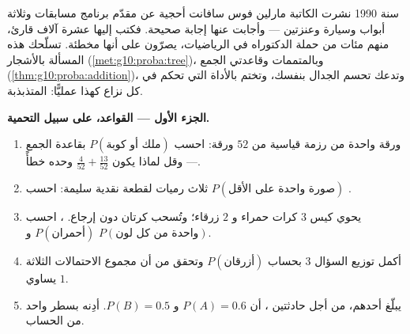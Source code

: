 \begin{problem}
\label{pb:g10:proba:1}
سنة 1990 نشرت الكاتبة مارلين فوس سافانت أحجية عن
مقدّم برنامج مسابقات وثلاثة أبواب وسيارة وعنزتين ---
وأجابت عنها إجابة صحيحة. فكتب إليها عشرة آلاف قارئ، منهم مئات
من حملة الدكتوراه في الرياضيات، يصرّون على أنها مخطئة. تسلّحك هذه
المسألة بالأشجار (\cref{met:g10:proba:tree})،
وبالمتممات وقاعدتي الجمع
(\cref{thm:g10:proba:addition})، وتدعك تحسم الجدال
بنفسك، وتختم بالأداة التي تحكم في كل نزاع
كهذا عمليًّا:  المتذبذبة.

\medskip
\noindent\textbf{الجزء الأول --- القواعد، على سبيل التحمية.}
\begin{enumerate}
  \item ورقة واحدة من رزمة قياسية من $52$ ورقة: احسب
        $P(\text{ملك أو كوبة})$ بقاعدة الجمع ---
        وقل لماذا يكون $\frac{4}{52} + \frac{13}{52}$ وحده
        خطأً.
  \item ثلاث رميات لقطعة نقدية سليمة: احسب $P(\text{صورة واحدة على الأقل})$ .
  \item يحوي كيس $3$ كرات حمراء و $2$ زرقاء؛ وتُسحب كرتان
        دون إرجاع. ، احسب
        $P(\text{أحمران})$ و $P(\text{واحدة من كل لون})$.
  \item أكمل توزيع السؤال 3 بحساب
        $P(\text{أزرقان})$ وتحقق من أن مجموع الاحتمالات الثلاثة
        يساوي $1$.
  \item يبلّغ أحدهم، من أجل حادثتين \emph{}،
        أن $P(A) = 0.6$ و $P(B) = 0.5$. أدِنه بسطر
        واحد من الحساب.
\end{enumerate}


\end{problem}
